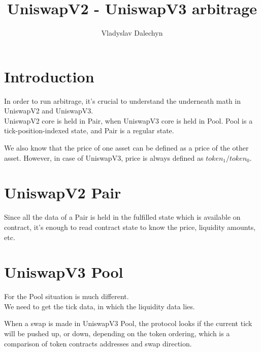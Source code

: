 \documentclass{article}
\title{UniswapV2 - UniswapV3 arbitrage}
\author{Vladyslav Dalechyn}
\begin{document}
\maketitle


\section{Introduction}
    In order to run arbitrage, it's crucial to understand the underneath math in UniswapV2 and UniswapV3.\\

    UniswapV2 core is held in Pair, when UniswapV3 core is held in Pool.
    Pool is a tick-position-indexed state, and Pair is a regular state.

    We also know that the price of one asset can be defined as a price of the other asset.
    However, in case of UniswapV3, price is always defined as $token_1/token_0$.

\section{UniswapV2 Pair}
    Since all the data of a Pair is held in the fulfilled state which is available on contract,
    it's enough to read contract state to know the price, liquidity amounts, etc.

\section{UniswapV3 Pool}
    For the Pool situation is much different.\\
    We need to get the tick data, in which the liquidity data lies.

    When a swap is made in UniswapV3 Pool, the protocol looks if the current tick will be pushed
    up, or down, depending on the token ordering, which is a comparison of token contracts addresses and swap direction.
\end{document}
